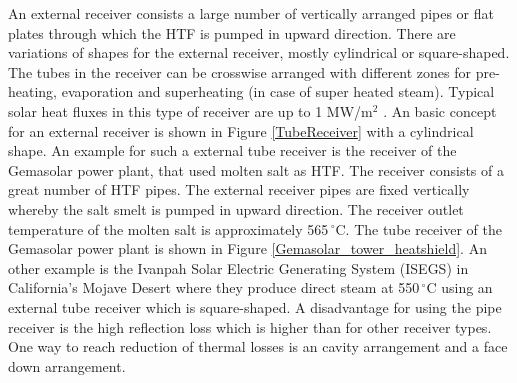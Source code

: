 An external receiver consists a large number of vertically arranged pipes or flat plates through which the HTF is pumped in upward direction. There are variations of shapes for the external receiver, mostly cylindrical or square-shaped. The tubes in the receiver can be crosswise arranged with different zones for pre-heating, evaporation and superheating (in case of super heated steam). Typical solar heat fluxes in this type of receiver are up to 1 MW/m$^2$ \cite{Pitz-Paal.2013}. An basic concept for an external receiver is shown in Figure \ref{TubeReceiver} with a cylindrical shape. An example for such a external tube receiver is the receiver of the Gemasolar power plant, that used molten salt as HTF. The receiver consists of a great number of HTF pipes. The external receiver pipes are fixed vertically whereby the salt smelt is pumped in upward direction. The receiver outlet temperature of the molten salt is approximately 565$\,^{\circ}\mathrm{C}$. The tube receiver of the Gemasolar power plant is shown in Figure \ref{Gemasolar_tower_heatshield}. An other example  is the Ivanpah Solar Electric Generating System (ISEGS) in California’s Mojave Desert where they produce direct steam at 550$\,^{\circ}\mathrm{C}$ using an external tube receiver which is square-shaped. A disadvantage for using the pipe receiver is the high reflection loss which is higher than for other receiver types. One way to reach reduction of thermal losses is an cavity arrangement and a face down arrangement. \cite{Hoffschmidt2014}
